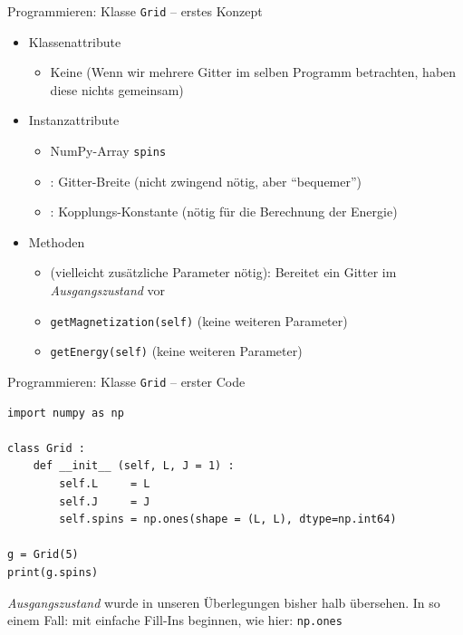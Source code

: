 
\begin{frame}[fragile]{Programmieren: Klasse \texttt{Grid} -- erstes Konzept}
%
\begin{tcolorbox}[title=Klasse \texttt{Grid}]
\begin{itemize}
\item Klassenattribute
	\begin{itemize}
	\item Keine (Wenn wir mehrere Gitter im selben Programm betrachten, haben diese nichts gemeinsam)
	\end{itemize}
\item Instanzattribute
	\begin{itemize}
	\item NumPy-Array \texttt{spins}
	\item {}: Gitter-Breite (nicht zwingend nötig, aber \enquote{bequemer})
	\item {}: Kopplungs-Konstante (nötig für die Berechnung der Energie)
	\end{itemize}
\item Methoden
	\begin{itemize}
	\item {} (vielleicht zusätzliche Parameter nötig): Bereitet ein Gitter im \emph{Ausgangszustand} vor
	\item \texttt{getMagnetization(self)} (keine weiteren Parameter)
	\item \texttt{getEnergy(self)} (keine weiteren Parameter)
	\end{itemize}
\end{itemize}
\end{tcolorbox}
%
\end{frame}


\begin{frame}[fragile]{Programmieren: Klasse \texttt{Grid} -- erster Code}
%
\begin{codebox}
\begin{verbatim}
import numpy as np

class Grid :
    def __init__ (self, L, J = 1) :
        self.L     = L
        self.J     = J
        self.spins = np.ones(shape = (L, L), dtype=np.int64)

g = Grid(5)
print(g.spins)
\end{verbatim}
\end{codebox}
%
\begin{hintbox}
\emph{Ausgangszustand} wurde in unseren Überlegungen bisher halb übersehen. In so einem Fall: mit einfache Fill-Ins beginnen, wie hier: \texttt{np.ones}
\end{hintbox}
%
\end{frame}

